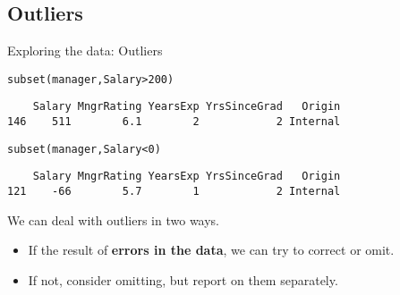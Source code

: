 \documentclass{beamer}\usepackage[]{graphicx}\usepackage[]{color}
\makeatletter
\newcommand{\hlnum}[1]{\textcolor[rgb]{0.824,0.412,0.118}{#1}}%
\newcommand{\hlstr}[1]{\textcolor[rgb]{1,0.894,0.71}{#1}}%
\newcommand{\hlopt}[1]{\textcolor[rgb]{1,0.894,0.769}{#1}}%
\newcommand{\hlstd}[1]{\textcolor[rgb]{1,0.894,0.769}{#1}}%
\newcommand{\hlkwc}[1]{\textcolor[rgb]{0.78,0.941,0.545}{#1}}%
\newcommand{\hlkwd}[1]{\textcolor[rgb]{1,0.78,0.769}{#1}}%
\newenvironment{kframe}{%
 \def\at@end@of@kframe{}%
 \ifinner\ifhmode%
  \def\at@end@of@kframe{\end{minipage}}%
  \begin{minipage}{\columnwidth}%
 \fi\fi%
 \def\FrameCommand##1{\hskip\@totalleftmargin \hskip-\fboxsep
 \colorbox{shadecolor}{##1}\hskip-\fboxsep
     \hskip-\linewidth \hskip-\@totalleftmargin \hskip\columnwidth}%
 \MakeFramed {\advance\hsize-\width
   \@totalleftmargin\z@ \linewidth\hsize
   \@setminipage}}%
 {\par\unskip\endMakeFramed%
 \at@end@of@kframe}
\newenvironment{knitrout}{}{} %
\makeatother
\begin{document}
\begin{darkframes}
    \section{Outliers}


    \begin{frame}[fragile]{Exploring the data: Outliers}
\begin{knitrout}
\begin{kframe}
\begin{alltt}
\hlkwd{subset}\hlstd{(manager, Salary} \hlopt{>} \hlnum{200}\hlstd{)}
\end{alltt}
\begin{verbatim}
    Salary MngrRating YearsExp YrsSinceGrad   Origin
146    511        6.1        2            2 Internal
\end{verbatim}
\begin{alltt}
\hlkwd{subset}\hlstd{(manager, Salary} \hlopt{<} \hlnum{0}\hlstd{)}
\end{alltt}
\begin{verbatim}
    Salary MngrRating YearsExp YrsSinceGrad   Origin
121    -66        5.7        1            2 Internal
\end{verbatim}
\end{kframe}
\end{knitrout}
      \pause

      We can deal with outliers in two ways.
      \begin{itemize}[<+->]
        \item If the result of \textbf{errors in the data}, we can try to correct or omit.
        \item If not, consider omitting, but report on them separately.
      \end{itemize}
    \end{frame}


\end{darkframes}
\end{document}
